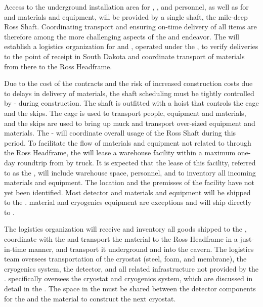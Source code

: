 Access to the underground installation area for , , and  personnel, as well as for  and  materials and equipment, will be provided by a single shaft, the mile-deep Ross Shaft.
Coordinating transport and ensuring on-time delivery of all items are therefore among the more challenging aspects of the  and  endeavor.
The  will establish a logistics organization for  and , operated under the , to verify deliveries to the point of receipt in South Dakota and coordinate transport of materials from there to the Ross Headframe.

Due to the cost of the  contracts and the risk of increased construction costs due to delays in delivery of materials, the shaft scheduling must be tightly controlled by - during construction.
The shaft is outfitted with a hoist that controls the cage and the skips.
The cage is used to transport people, equipment and materials, and the skips are used to bring up muck and transport over-sized equipment and materials.
The -  will coordinate overall usage of the Ross Shaft during this period.
To facilitate the flow of materials and equipment not related to  through the Ross Headframe, the  will lease a warehouse facility within a maximum one-day roundtrip from  by truck.
It is expected that the lease of this facility, referred to as the , will include warehouse space, personnel, and  to inventory all incoming materials and equipment.
The location and the premisses  of the facility have not yet been identified.
Most detector and materials and equipment will be shipped to the .
 material and cryogenics equipment are exceptions and will ship directly to .

The  logistics organization will receive and inventory all goods shipped to the , coordinate with the  and transport the material to the Ross Headframe in a just-in-time manner, and transport it underground and into the cavern.
The  logistics team oversees transportation of the cryostat (steel, foam, and membrane), the cryogenics system, the detector, and all related infrastructure not provided by the .
 specifically oversees the cryostat and cryogenics system, which are discussed in detail in the  .
The space in the  must be shared between the detector components for the  and the  material to construct the next cryostat.

